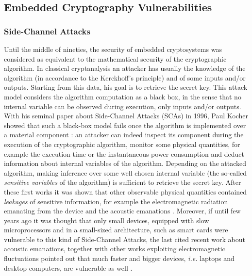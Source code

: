 \subsection{Embedded Cryptography Vulnerabilities}\label{sec:vulnerabilities}
\subsubsection{Side-Channel Attacks}
Until the middle of nineties, the security of embedded cryptosystems was considered as equivalent to the mathematical security of the cryptographic algorithm. In classical cryptanalysis an attacker has usually the knowledge of the algorithm (in accordance to the Kerckhoff's principle) and of some inputs and/or outputs. Starting from this data, his goal is to retrieve the secret key. This attack model considers the algorithm computation as a black box, in the sense that no internal variable can be observed during execution, only inputs and/or outputs. With his seminal paper about Side-Channel Attacks (SCAs) in 1996, Paul Kocher showed that such a black-box model fails once the algorithm is implemented over a material component \cite{kocher1996timing}: an attacker can indeed inspect its component during the execution of the cryptographic algorithm, monitor some physical quantities, for example the execution time \cite{kocher1996timing} or the instantaneous power consumption \cite{kocher1999differential} and deduct information about internal variables of the algorithm. Depending on the attacked algorithm, making inference over some well chosen internal variable (the so-called \emph{sensitive variables} of the algorithm) is sufficient to retrieve the secret key. After these first works it was shown that other observable physical quantities contained \emph{leakages} of sensitive information, for example the electromagnetic radiation emanating from the device \cite{gandolfi2001electromagnetic,quisquater2001electromagnetic} and the acoustic emanations \cite{genkin2014rsa}. Moreover, if until few years ago it was thought that only small devices, equipped with slow microprocessors and in a small-sized architecture, such as smart cards were vulnerable to this kind of Side-Channel Attacks, the last cited recent work about acoustic emanations, together with other works exploiting electromagnetic fluctuations pointed out that much faster and bigger devices, \emph{i.e.} laptops and desktop computers, are vulnerable as well \cite{genkin2015stealing,genkin2015get,genkin2016ecdh}.

